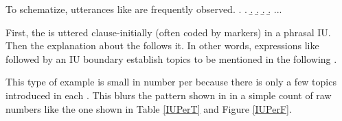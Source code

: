 To schematize,
utterances like \Next are frequently observed.
%
\ex.
 \a.  \tp{\dvline}
 \b.  \tp{\dvline}
 \b.  \tp{\dvline}
 \b.  \tp{\dvline}
 \b. ...

First, the  is uttered clause-initially (often coded by  markers) in a phrasal IU.
Then the explanation about the  follows it.
In other words, expressions like \Last[a] followed by an IU boundary establish topics to be mentioned in the following .

This type of example is small in number per  because there is only a few topics introduced in each .
This blurs the pattern shown in \Last in a simple count of raw numbers like the one shown in Table \ref{IUPerT} and Figure \ref{IUPerF}.
%
%
